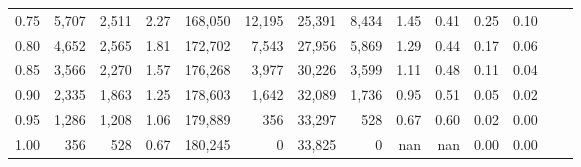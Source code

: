 \begin{tabular}{rrrrrrrrrrrrrr}
0.75 &   5,707 &  2,511 &    2.27 &  168,050 &   12,195 &  25,391 &   8,434 &  1.45 &  0.41 &  0.25 &      0.10 \\
0.80 &   4,652 &  2,565 &    1.81 &  172,702 &    7,543 &  27,956 &   5,869 &  1.29 &  0.44 &  0.17 &      0.06 \\
0.85 &   3,566 &  2,270 &    1.57 &  176,268 &    3,977 &  30,226 &   3,599 &  1.11 &  0.48 &  0.11 &      0.04 \\
0.90 &   2,335 &  1,863 &    1.25 &  178,603 &    1,642 &  32,089 &   1,736 &  0.95 &  0.51 &  0.05 &      0.02 \\
0.95 &   1,286 &  1,208 &    1.06 &  179,889 &      356 &  33,297 &     528 &  0.67 &  0.60 &  0.02 &      0.00 \\
1.00 &     356 &    528 &    0.67 &  180,245 &        0 &  33,825 &       0 &   nan &   nan &  0.00 &      0.00 \\
\bottomrule
\end{tabular}
